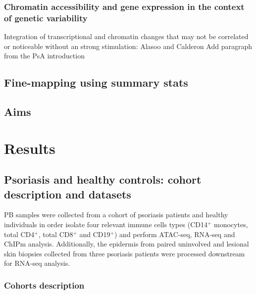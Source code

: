 \subsubsection{Chromatin accessibility and gene expression in the context of genetic variability}
Integration of transcriptional and chromatin changes that may not be correlated or noticeable without an strong stimulation: Alasoo and Calderon
Add paragraph from the PsA introduction

\subsection{Fine-mapping using summary stats}


\subsection{Aims}



\section{Results}
\subsection{Psoriasis and healthy controls: cohort description and datasets}
PB samples were collected from a cohort of psoriasis patients and healthy individuals in order isolate four relevant immune cells types (CD14$^+$ monocytes, total CD4$^+$, total CD8$^+$ and CD19$^+$) and perform ATAC-seq, RNA-seq and ChIPm analysis. Additionally, the epidermis from paired uninvolved and lesional skin biopsies collected from three psoriasis patients were processed downstream for RNA-seq analysis.

\subsubsection{Cohorts description}

